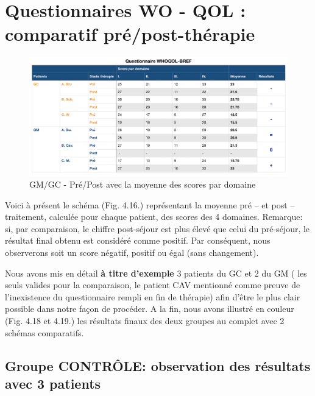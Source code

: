 \section{Questionnaires WO - QOL : comparatif pré/post-thérapie }


\begin{figure}[tbh]
\centering
\includegraphics[width=1.2\linewidth]{images/graphiques/questionnaire_wq.png}
\caption[Questionnaire WHOQOL-BREF]{GM/GC - Pré/Post avec la moyenne des scores par domaine}

\end{figure}
Voici à présent le schéma (Fig. 4.16.) représentant la
moyenne pré -- et post -- traitement, calculée pour chaque patient, des scores
des 4 domaines.
Remarque: si, par comparaison, le chiffre post-séjour est plus élevé
que celui du
pré-séjour, le résultat final obtenu est considéré comme
positif. Par conséquent, nous
observerons soit un score négatif, positif ou égal (sans changement).


Nous avons mis en détail  \textbf{à titre d'exemple } 3 patients du GC et 2 du GM
( les seuls valides pour la comparaison, le patient CAV mentionné comme preuve de l'inexistence du questionnaire rempli en fin de thérapie) afin d'être le plus clair possible
dans notre façon de procéder.
A la fin, nous avons illustré en couleur (Fig. 4.18 et 4.19.) les
résultats finaux des deux groupes au complet avec 2 schémas
comparatifs.
\subsection{Groupe CONTRÔLE: observation des résultats avec 3 patients}

